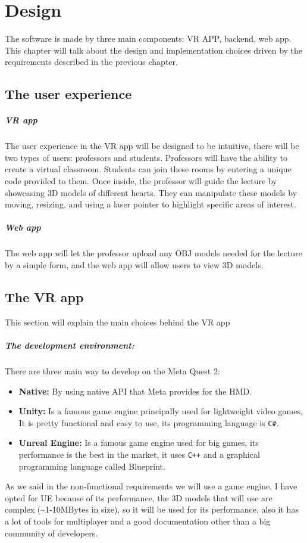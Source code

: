 
\chapter{Design} %
\noindent
The software is made by three main components: \ac{VR} APP, backend, web app. This chapter will talk about the design and implementation choices driven by the requirements described in the previous chapter.
\section{The user experience}
\paragraph{VR app}
The user experience in the \ac{VR} app will be designed to be intuitive, there will be two types of users: professors and students.
Professors will have the ability to create a virtual classroom. Students can join these rooms by entering a unique code provided to them. Once inside, the professor will guide the lecture by showcasing 3D models of different hearts.
They can manipulate these models by moving, resizing, and using a laser pointer to highlight specific areas of interest. 
\paragraph{Web app}
The web app will let the professor upload any OBJ models needed for the lecture by a simple form, and the web app will allow users to view 3D models.

\section{The VR app}
\noindent
This section will explain the main choices behind the \ac{VR} app
\paragraph{The development environment:} 
There are three main way to develop on the Meta Quest 2:

\begin{itemize}
  \item \textbf{Native:} By using native \ac{API} that Meta provides for the \ac{HMD}.
  \item \textbf{Unity:} Is a famous game engine principally used for lightweight video games, It is pretty functional and easy to use, its programming language is \texttt{C\#}. 
  \item \textbf{Unreal Engine:} Is a famous game engine used for big games, its performance is the best in the market, it uses \texttt{C++} and a graphical programming language called Blueprint.
\end{itemize}
\noindent
As we said in the non-functional requirements we will use a game engine, I have opted for \ac{UE} because of its performance, the 3D models that will use are complex (\textasciitilde1-10MBytes in size),
so it will be used for its performance, also it has a lot of tools for multiplayer and a good documentation other than a big community of developers.

